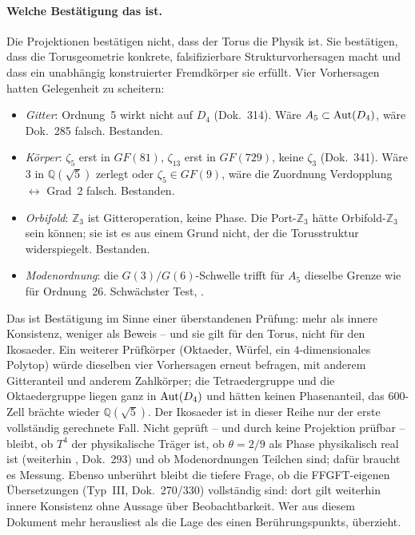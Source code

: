 \paragraph{Welche Bestätigung das ist.} Die Projektionen bestätigen nicht,
dass der Torus die Physik ist. Sie bestätigen, dass die Torusgeometrie
konkrete, falsifizierbare Strukturvorhersagen macht und dass ein
unabhängig konstruierter Fremdkörper sie erfüllt. Vier Vorhersagen hatten
Gelegenheit zu scheitern:
\begin{itemize}[nosep]
\item \emph{Gitter}: Ordnung~5 wirkt nicht auf $D_4$ (Dok.~314). Wäre
      $A_5\subset{\rm Aut}(D_4)$, wäre Dok.~285 falsch. Bestanden.
\item \emph{Körper}: $\zeta_5$ erst in $GF(81)$, $\zeta_{13}$ erst in
      $GF(729)$, keine $\zeta_3$ (Dok.~341). Wäre $3$ in $\mathbb{Q}(\sqrt5)$
      zerlegt oder $\zeta_5\in GF(9)$, wäre die Zuordnung Verdopplung
      $\leftrightarrow$ Grad~2 falsch. Bestanden.
\item \emph{Orbifold}: $\mathbb{Z}_3$ ist Gitteroperation, keine Phase. Die
      Port-$\mathbb{Z}_3$ hätte Orbifold-$\mathbb{Z}_3$ sein können; sie ist
      es aus einem Grund nicht, der die Torusstruktur widerspiegelt. Bestanden.
\item \emph{Modenordnung}: die $G(3)/G(6)$-Schwelle trifft für $A_5$
      dieselbe Grenze wie für Ordnung~26. Schwächster Test, \SM.
\end{itemize}
Das ist Bestätigung im Sinne einer überstandenen Prüfung: mehr als innere
Konsistenz, weniger als Beweis -- und sie gilt für den Torus, nicht für
den Ikosaeder. Ein weiterer Prüfkörper (Oktaeder, Würfel, ein
$4$-dimensionales Polytop) würde dieselben vier Vorhersagen erneut
befragen, mit anderem Gitteranteil und anderem Zahlkörper; die
Tetraedergruppe und die Oktaedergruppe liegen ganz in ${\rm Aut}(D_4)$ und
hätten keinen Phasenanteil, das $600$-Zell brächte wieder $\mathbb{Q}(\sqrt5)$.
Der Ikosaeder ist in dieser Reihe nur der erste vollständig gerechnete
Fall. Nicht geprüft -- und durch keine
Projektion prüfbar -- bleibt, ob $T^4$ der physikalische Träger ist, ob
$\theta=2/9$ als Phase physikalisch real ist (weiterhin \KM, Dok.~293) und
ob Modenordnungen Teilchen sind; dafür braucht es Messung. Ebenso
unberührt bleibt die tiefere Frage, ob die FFGFT-eigenen Übersetzungen
(Typ~III, Dok.~270/330) vollständig sind: dort gilt weiterhin innere
Konsistenz ohne Aussage über Beobachtbarkeit. Wer aus diesem Dokument
mehr herausliest als die Lage des einen Berührungspunkts, überzieht.

